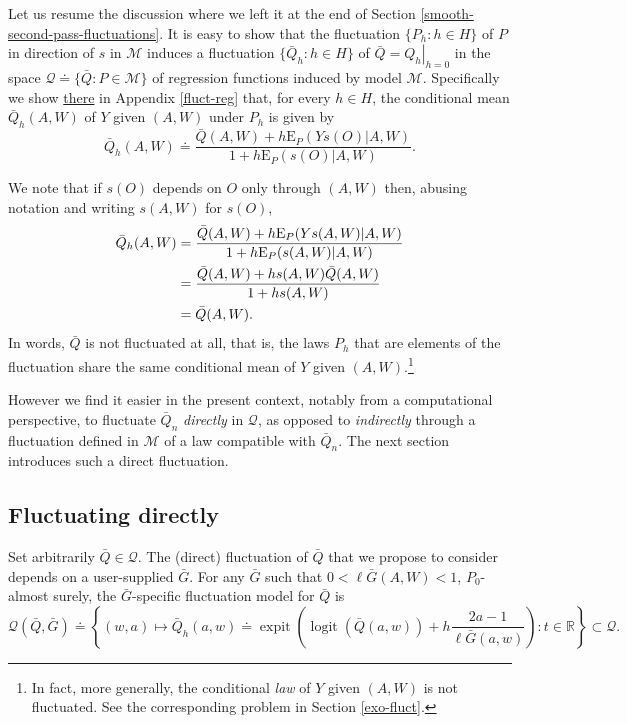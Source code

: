 \documentclass[
  11pt,
  openright,twoside]{book}
\DeclareMathOperator{\expit}{expit}
\DeclareMathOperator{\logit}{logit}
\newcommand{\bbR}{\mathbb{R}}
\newcommand{\defq}{\doteq}
\newcommand{\calM}{\mathcal{M}}
\newcommand{\calQ}{\mathcal{Q}}
\newcommand{\Exp}{\textrm{E}}
\newcommand{\Gbar}{\bar{G}}
\newcommand{\Qbar}{\bar{Q}}
\theoremstyle{definition}
\theoremstyle{definition}
\theoremstyle{definition}
\theoremstyle{definition}
\theoremstyle{remark}
\begin{document}
Let us resume the discussion where we left it at the end of Section
\ref{smooth-second-pass-fluctuations}. It is easy to show that the
fluctuation \(\{P_{h} : h \in H\}\) of \(P\) in direction of \(s\) in \(\calM\)
induces a fluctuation \(\{\Qbar_{h} : h \in H\}\) of \(\Qbar = \left.Q_{h}\right|_{h=0}\) in the space \(\calQ \defq \{\Qbar : P \in \calM\}\) of regression functions induced by model \(\calM\). Specifically we
show \protect\hyperlink{fluct-reg}{there} in Appendix \ref{fluct-reg} that, for every \(h \in H\), the conditional mean \(\Qbar_{h}(A,W)\) of \(Y\) given \((A,W)\) under \(P_{h}\)
is given by \begin{equation*}\Qbar_{h}(A,W)  \defq \frac{\Qbar(A,W)  + h
\Exp_{P}(Ys(O) | A,W)}{1 + h \Exp_{P}(s(O)|A,W)}.\end{equation*}

We note that if \(s(O)\) depends on \(O\) only through \((A,W)\) then, abusing
notation and writing \(s(A,W)\) for \(s(O)\),
\begin{align}
\Qbar_{h}(A,W)  &=  \frac{\Qbar(A,W)  +  h  \Exp_{P}(Ys(A,W)  |  A,W)}{1  +  h
\Exp_{P}(s(A,W)|A,W)}\notag\\&=\frac{\Qbar(A,W)  + h  s(A,W)\Qbar(A,W)}{1 +  h
s(A,W)}\notag\\&=\Qbar(A,W).\label{eq:Qbarh}
\end{align}
In words, \(\Qbar\) is not fluctuated at all, that is, the laws \(P_{h}\) that are
elements of the fluctuation share the same conditional mean of \(Y\) given
\((A,W)\).\footnote{In fact, more generally, the conditional \emph{law} of \(Y\) given \((A,W)\)
  is not fluctuated. See the corresponding problem in Section \ref{exo-fluct}.}

However we find it easier in the present context, notably from a computational
perspective, to fluctuate \(\Qbar_{n}\) \emph{directly} in \(\calQ\), as opposed to
\emph{indirectly} through a fluctuation defined in \(\calM\) of a law compatible with
\(\Qbar_{n}\). The next section introduces such a direct fluctuation.

\hypertarget{fluct-direct}{%
\subsection{Fluctuating directly}\label{fluct-direct}}

Set arbitrarily \(\Qbar \in \calQ\). The (direct) fluctuation of \(\Qbar\) that we
propose to consider depends on a user-supplied \(\Gbar\). For any \(\Gbar\) such
that \(0 < \ell\Gbar(A,W) < 1\), \(P_{0}\)-almost surely, the \(\Gbar\)-specific
fluctuation model for \(\Qbar\) is
\begin{equation} 
\calQ(\Qbar,\Gbar)\defq      \left\{(w,a)       \mapsto      \Qbar_{h}(a,w)      \defq
\expit\left(\logit\left(\Qbar(a,w)\right) +  h \frac{2a -  1}{\ell \Gbar(a,w)}
\right) : t \in \bbR\right\} \subset \calQ. \label{eq:Q-fluct} 
\end{equation}
\end{document}
